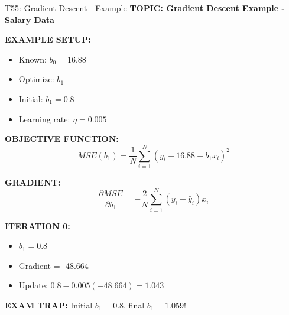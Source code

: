 \documentclass[8pt]{beamer}
\begin{document}
	\begin{frame}{T55: Gradient Descent - Example}
		\fontsize{6.5}{7.5}\selectfont
		\textbf{TOPIC: Gradient Descent Example - Salary Data}
		
		\vspace{0.1cm}
		\textbf{EXAMPLE SETUP:}
		\begin{itemize}
			\item Known: $b_0 = 16.88$
			\item Optimize: $b_1$
			\item Initial: $b_1 = 0.8$
			\item Learning rate: $\eta = 0.005$
		\end{itemize}
		
		\vspace{0.1cm}
		\textbf{OBJECTIVE FUNCTION:}
		\[
		MSE(b_1) = \frac{1}{N}\sum_{i=1}^N (y_i - 16.88 - b_1 x_i)^2
		\]
		
		\vspace{0.1cm}
		\textbf{GRADIENT:}
		\[
		\frac{\partial MSE}{\partial b_1} = -\frac{2}{N}\sum_{i=1}^N (y_i - \hat{y}_i) x_i
		\]
		
		\vspace{0.1cm}
		\textbf{ITERATION 0:}
		\begin{itemize}
			\item $b_1 = 0.8$
			\item Gradient = -48.664
			\item Update: $0.8 - 0.005(-48.664) = 1.043$
		\end{itemize}
		
		\textcolor{myred}{\textbf{EXAM TRAP:}} Initial $b_1 = 0.8$, final $b_1 = 1.059$!
	\end{frame}
	
\end{document}
